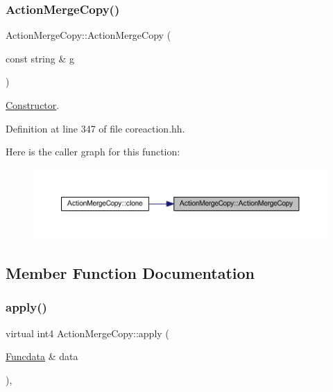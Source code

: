 \subsubsection{\texorpdfstring{ActionMergeCopy()}{ActionMergeCopy()}}
{\footnotesize\ttfamily Action\+Merge\+Copy\+::\+Action\+Merge\+Copy (\begin{DoxyParamCaption}\item[{const string \&}]{g }\end{DoxyParamCaption})\hspace{0.3cm}{\ttfamily [inline]}}



\mbox{\hyperlink{class_constructor}{Constructor}}. 



Definition at line 347 of file coreaction.\+hh.

Here is the caller graph for this function\+:
\nopagebreak
\begin{figure}[H]
\begin{center}
\leavevmode
\includegraphics[width=350pt]{class_action_merge_copy_a4640af5b1b6128bc2468f71ac579545d_icgraph}
\end{center}
\end{figure}


\subsection{Member Function Documentation}
\mbox{\label{class_action_merge_copy_a363eedc3ead59931897e73fb55a31a0e}} 
\subsubsection{\texorpdfstring{apply()}{apply()}}
{\footnotesize\ttfamily virtual int4 Action\+Merge\+Copy\+::apply (\begin{DoxyParamCaption}\item[{\mbox{\hyperlink{class_funcdata}{Funcdata}} \&}]{data }\end{DoxyParamCaption})\hspace{0.3cm}{\ttfamily [inline]}, {\ttfamily [virtual]}}



